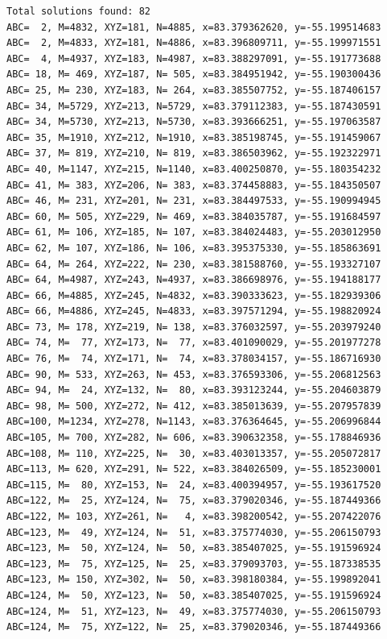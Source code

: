 \documentclass{article}
\begin{document}
\begin{enumerate}
\begin{verbatim}
Total solutions found: 82
ABC=  2, M=4832, XYZ=181, N=4885, x=83.379362620, y=-55.199514683
ABC=  2, M=4833, XYZ=181, N=4886, x=83.396809711, y=-55.199971551
ABC=  4, M=4937, XYZ=183, N=4987, x=83.388297091, y=-55.191773688
ABC= 18, M= 469, XYZ=187, N= 505, x=83.384951942, y=-55.190300436
ABC= 25, M= 230, XYZ=183, N= 264, x=83.385507752, y=-55.187406157
ABC= 34, M=5729, XYZ=213, N=5729, x=83.379112383, y=-55.187430591
ABC= 34, M=5730, XYZ=213, N=5730, x=83.393666251, y=-55.197063587
ABC= 35, M=1910, XYZ=212, N=1910, x=83.385198745, y=-55.191459067
ABC= 37, M= 819, XYZ=210, N= 819, x=83.386503962, y=-55.192322971
ABC= 40, M=1147, XYZ=215, N=1140, x=83.400250870, y=-55.180354232
ABC= 41, M= 383, XYZ=206, N= 383, x=83.374458883, y=-55.184350507
ABC= 46, M= 231, XYZ=201, N= 231, x=83.384497533, y=-55.190994945
ABC= 60, M= 505, XYZ=229, N= 469, x=83.384035787, y=-55.191684597
ABC= 61, M= 106, XYZ=185, N= 107, x=83.384024483, y=-55.203012950
ABC= 62, M= 107, XYZ=186, N= 106, x=83.395375330, y=-55.185863691
ABC= 64, M= 264, XYZ=222, N= 230, x=83.381588760, y=-55.193327107
ABC= 64, M=4987, XYZ=243, N=4937, x=83.386698976, y=-55.194188177
ABC= 66, M=4885, XYZ=245, N=4832, x=83.390333623, y=-55.182939306
ABC= 66, M=4886, XYZ=245, N=4833, x=83.397571294, y=-55.198820924
ABC= 73, M= 178, XYZ=219, N= 138, x=83.376032597, y=-55.203979240
ABC= 74, M=  77, XYZ=173, N=  77, x=83.401090029, y=-55.201977278
ABC= 76, M=  74, XYZ=171, N=  74, x=83.378034157, y=-55.186716930
ABC= 90, M= 533, XYZ=263, N= 453, x=83.376593306, y=-55.206812563
ABC= 94, M=  24, XYZ=132, N=  80, x=83.393123244, y=-55.204603879
ABC= 98, M= 500, XYZ=272, N= 412, x=83.385013639, y=-55.207957839
ABC=100, M=1234, XYZ=278, N=1143, x=83.376364645, y=-55.206996844
ABC=105, M= 700, XYZ=282, N= 606, x=83.390632358, y=-55.178846936
ABC=108, M= 110, XYZ=225, N=  30, x=83.403013357, y=-55.205072817
ABC=113, M= 620, XYZ=291, N= 522, x=83.384026509, y=-55.185230001
ABC=115, M=  80, XYZ=153, N=  24, x=83.400394957, y=-55.193617520
ABC=122, M=  25, XYZ=124, N=  75, x=83.379020346, y=-55.187449366
ABC=122, M= 103, XYZ=261, N=   4, x=83.398200542, y=-55.207422076
ABC=123, M=  49, XYZ=124, N=  51, x=83.375774030, y=-55.206150793
ABC=123, M=  50, XYZ=124, N=  50, x=83.385407025, y=-55.191596924
ABC=123, M=  75, XYZ=125, N=  25, x=83.379093703, y=-55.187338535
ABC=123, M= 150, XYZ=302, N=  50, x=83.398180384, y=-55.199892041
ABC=124, M=  50, XYZ=123, N=  50, x=83.385407025, y=-55.191596924
ABC=124, M=  51, XYZ=123, N=  49, x=83.375774030, y=-55.206150793
ABC=124, M=  75, XYZ=122, N=  25, x=83.379020346, y=-55.187449366

\end{verbatim}
\end{enumerate}
\end{document}
